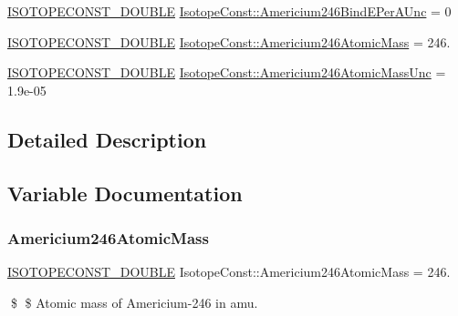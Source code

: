 \begin{DoxyCompactItemize}
\mbox{\hyperlink{group___isotope_const-_macros_ga8f45a7272ce02c0b4c65c44636ed719a}{I\+S\+O\+T\+O\+P\+E\+C\+O\+N\+S\+T\+\_\+\+D\+O\+U\+B\+LE}} \mbox{\hyperlink{group___isotope_const-_americium-_am246_ga98caa266460f0a3e3f926f2dc47edd60}{Isotope\+Const\+::\+Americium246\+Bind\+E\+Per\+A\+Unc}} = 0
\item 
\mbox{\hyperlink{group___isotope_const-_macros_ga8f45a7272ce02c0b4c65c44636ed719a}{I\+S\+O\+T\+O\+P\+E\+C\+O\+N\+S\+T\+\_\+\+D\+O\+U\+B\+LE}} \mbox{\hyperlink{group___isotope_const-_americium-_am246_gaeafab091a9fcb6fc5685e16844f50a87}{Isotope\+Const\+::\+Americium246\+Atomic\+Mass}} = 246.
\item 
\mbox{\hyperlink{group___isotope_const-_macros_ga8f45a7272ce02c0b4c65c44636ed719a}{I\+S\+O\+T\+O\+P\+E\+C\+O\+N\+S\+T\+\_\+\+D\+O\+U\+B\+LE}} \mbox{\hyperlink{group___isotope_const-_americium-_am246_ga7254a987fd609eb058b0e0370be145f9}{Isotope\+Const\+::\+Americium246\+Atomic\+Mass\+Unc}} = 1.\+9e-\/05
\end{DoxyCompactItemize}


\subsection{Detailed Description}


\subsection{Variable Documentation}
\mbox{\label{group___isotope_const-_americium-_am246_gaeafab091a9fcb6fc5685e16844f50a87}} 
\subsubsection{\texorpdfstring{Americium246\+Atomic\+Mass}{Americium246AtomicMass}}
{\footnotesize\ttfamily \mbox{\hyperlink{group___isotope_const-_macros_ga8f45a7272ce02c0b4c65c44636ed719a}{I\+S\+O\+T\+O\+P\+E\+C\+O\+N\+S\+T\+\_\+\+D\+O\+U\+B\+LE}} Isotope\+Const\+::\+Americium246\+Atomic\+Mass = 246.}

\$ \$ Atomic mass of Americium-\/246 in amu. \mbox{\label{group___isotope_const-_americium-_am246_ga7254a987fd609eb058b0e0370be145f9}} 
